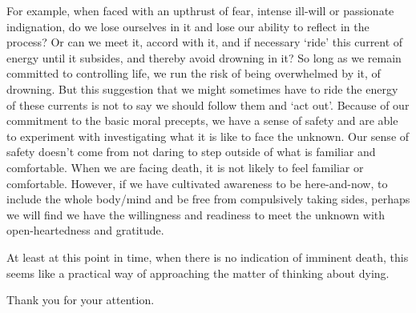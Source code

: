 For example, when faced with an upthrust of fear, intense ill-will or
passionate indignation, do we lose ourselves in it and lose our ability
to reflect in the process? Or can we meet it, accord with it, and if
necessary ‘ride’ this current of energy until it subsides, and thereby
avoid drowning in it? So long as we remain committed to controlling
life, we run the risk of being overwhelmed by it, of drowning. But this
suggestion that we might sometimes have to ride the energy of these
currents is not to say we should follow them and ‘act out’. Because of
our commitment to the basic moral precepts, we have a sense of safety
and are able to experiment with investigating what it is like to face
the unknown. Our sense of safety doesn’t come from not daring to step
outside of what is familiar and comfortable. When we are facing death,
it is not likely to feel familiar or comfortable. However, if we have
cultivated awareness to be here-and-now, to include the whole body/mind
and be free from compulsively taking sides, perhaps we will find we have
the willingness and readiness to meet the unknown with open-heartedness
and gratitude.

At least at this point in time, when there is no indication of imminent
death, this seems like a practical way of approaching the matter of
thinking about dying.

Thank you for your attention.

